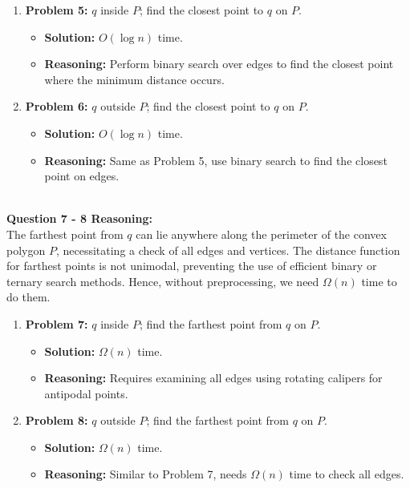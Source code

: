 \documentclass{article}
\begin{document}
\begin{enumerate}
    \item \textbf{Problem 5:} \( q \) inside \( P \); find the closest point to \( q \) on \( P \).
    \begin{itemize}
        \item \textbf{Solution:} \( O(\log n) \) time.
        \item \textbf{Reasoning:} Perform binary search over edges to find the closest point where the minimum distance occurs.
    \end{itemize}

    \item \textbf{Problem 6:} \( q \) outside \( P \); find the closest point to \( q \) on \( P \).
    \begin{itemize}
        \item \textbf{Solution:} \( O(\log n) \) time.
        \item \textbf{Reasoning:} Same as Problem 5, use binary search to find the closest point on edges.
    \end{itemize}
\end{enumerate}
\\
\textbf{Question 7 - 8 Reasoning: }
\\
The farthest point from $q$ can lie anywhere along the perimeter of the convex polygon $P$, necessitating a check of all edges and vertices.
The distance function for farthest points is not unimodal, preventing the use of efficient binary or ternary search methods.
Hence, without preprocessing, we need $\Omega(n)$ time to do them.

\begin{enumerate}
    \item \textbf{Problem 7:} \( q \) inside \( P \); find the farthest point from \( q \) on \( P \).
    \begin{itemize}
        \item \textbf{Solution:} \( \Omega(n) \) time.
        \item \textbf{Reasoning:} Requires examining all edges using rotating calipers for antipodal points.
    \end{itemize}

    \item \textbf{Problem 8:} \( q \) outside \( P \); find the farthest point from \( q \) on \( P \).
    \begin{itemize}
        \item \textbf{Solution:} \( \Omega(n) \) time.
        \item \textbf{Reasoning:} Similar to Problem 7, needs \( \Omega(n) \) time to check all edges.
    \end{itemize}
\end{enumerate}
\end{document}
